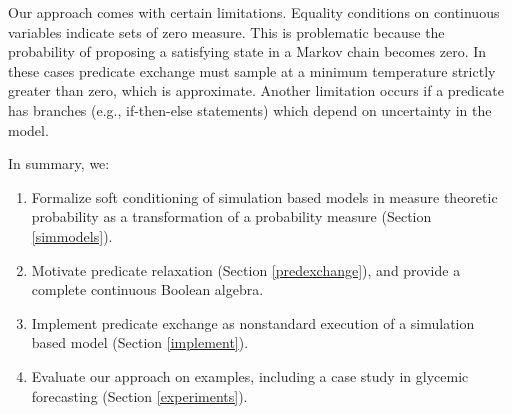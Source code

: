 Our approach comes with certain limitations.
Equality conditions on continuous variables indicate sets of zero measure.
This is problematic because the probability of proposing a satisfying state in a Markov chain becomes zero.
In these cases predicate exchange must sample at a minimum temperature strictly greater than zero, which is approximate.
Another limitation occurs if a predicate has branches (e.g., if-then-else statements) which depend on uncertainty in the model.

In summary, we:

\begin{enumerate}
	\item Formalize soft conditioning of simulation based  models in measure theoretic probability as a transformation of a probability measure (Section \ref{simmodels}).
	\item Motivate predicate relaxation (Section \ref{predexchange}), and provide a complete continuous Boolean algebra.
	\item Implement predicate exchange as nonstandard execution of a simulation based model (Section \ref{implement}).
	\item Evaluate our approach on examples, including a case study in glycemic forecasting (Section \ref{experiments}).
\end{enumerate}



